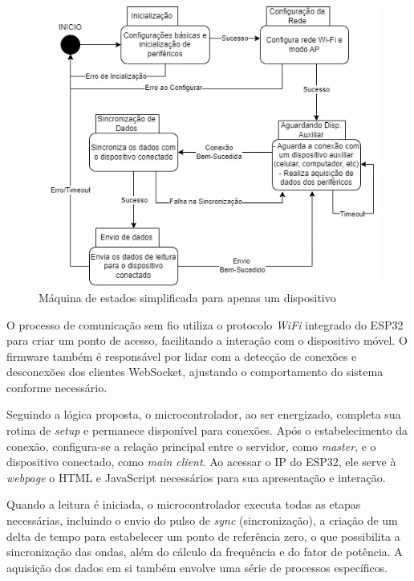 \begin{figure}[htb!]
    \caption{Máquina de estados simplificada para apenas um dispositivo}
    \label{fig:maq-estado-simp}
    \includegraphics[width=1.0\textwidth]{figuras/Maquina-Estados-Simplificada.jpg}
    \fonte{}
\end{figure}

O processo de comunicação sem fio utiliza o protocolo \textit{WiFi} integrado do ESP32 para criar um ponto de acesso, facilitando a interação com o dispositivo móvel. O firmware também é responsável por lidar com a detecção de conexões e desconexões dos clientes WebSocket, ajustando o comportamento do sistema conforme necessário.

Seguindo a lógica proposta, o microcontrolador, ao ser energizado, completa sua rotina de \textit{setup} e permanece disponível para conexões. Após o estabelecimento da conexão, configura-se a relação principal entre o servidor, como \textit{master}, e o dispositivo conectado, como \textit{main client}. Ao acessar o IP do ESP32, ele serve à \textit{webpage} o HTML e JavaScript necessários para sua apresentação e interação.

Quando a leitura é iniciada, o microcontrolador executa todas as etapas necessárias, incluindo o envio do pulso de \textit{sync} (sincronização), a criação de um delta de tempo para estabelecer um ponto de referência zero, o que possibilita a sincronização das ondas, além do cálculo da frequência e do fator de potência. A aquisição dos dados em si também envolve uma série de processos específicos.

